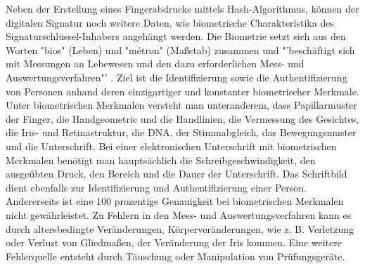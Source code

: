 Neben der Erstellung eines Fingerabdrucks mittels Hash-Algorithmus, können der digitalen Signatur noch weitere Daten, wie biometrische Charakteristika des Signaturschlüssel-Inhabers angehängt werden. Die Biometrie setzt sich aus den Worten "bios" (Leben) und "métron" (Maßstab) zusammen und "'beschäftigt sich mit Messungen an Lebewesen und den dazu erforderlichen Mess- und Auswertungsverfahren"' \cite{bioMet1}. Ziel ist die Identifizierung sowie die Authentifizierung von Personen anhand deren einzigartiger und konstanter biometrischer Merkmale. Unter biometrischen Merkmalen versteht man unteranderem, dass Papillarmuster der Finger, die Handgeometrie und die Handlinien, die Vermessung des Gesichtes, die Iris- und Retinastruktur, die DNA, der Stimmabgleich, das Bewegungsmuster und die Unterschrift. Bei einer elektronischen Unterschrift mit biometrischen Merkmalen benötigt man hauptsächlich die Schreibgeschwindigkeit, den ausgeübten Druck, den Bereich und die Dauer der Unterschrift. Das Schriftbild dient ebenfalls zur Identifizierung und Authentifizierung einer Person. Andererseits ist eine 100 prozentige Genauigkeit bei biometrischen Merkmalen nicht gewährleistet. Zu Fehlern in den Mess- und Auswertungsverfahren kann es durch altersbedingte Veränderungen, Körperveränderungen, wie z. B. Verletzung oder Verlust von Gliedmaßen, der Veränderung der Iris kommen. Eine weitere Fehlerquelle entsteht durch Täuschung oder Manipulation von Prüfungsgeräte. \cite{bioMet2}\cite{bioMet3}